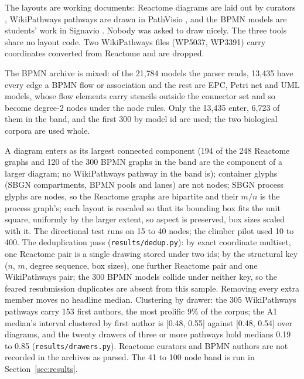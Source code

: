 \documentclass[11pt]{article}
\begin{document}
The layouts are working documents: Reactome diagrams are laid out by curators
\cite{fabregat18}, WikiPathways pathways are drawn in PathVisio \cite{agrawal24}, and the
BPMN models are students' work in Signavio \cite{kunze11, sola23}. Nobody was asked to draw
nicely. The three tools share no layout code. Two
WikiPathways files (WP5037, WP3391) carry coordinates converted from Reactome
\cite{bohler16} and are dropped.

The BPMN archive is mixed: of the 21{,}784 models the parser reads, 13{,}435 have every
edge a BPMN flow or association and the rest are EPC, Petri net and UML models, whose flow
elements carry stencils outside the connector set and so become degree-2 nodes under the
node rules. Only the 13{,}435 enter, 6{,}723 of them in the band, and the first 300 by
model id are used; the two biological corpora are used whole.

A diagram enters as its largest connected component (194 of the 248 Reactome graphs and
120 of the 300 BPMN graphs in the band are the component of a larger diagram; no
WikiPathways pathway in the band is); container glyphs (SBGN compartments, BPMN pools and
lanes) are not nodes; SBGN process glyphs are nodes, so the Reactome graphs are bipartite
and their $m/n$ is the process graph's; each layout is rescaled so that its bounding box
fits the unit square, uniformly by the larger extent, so aspect is preserved, box sizes
scaled with it. The directional test runs on 15 to 40
nodes; the climber pilot used 10 to 400. The deduplication pass
(\texttt{results/dedup.py}): by exact coordinate multiset, one Reactome pair is a single
drawing stored under two ids; by the structural key ($n$, $m$, degree sequence, box
sizes), one further Reactome pair and one WikiPathways pair; the 300 BPMN models collide
under neither key, so the feared resubmission duplicates are absent from this sample.
Removing every extra member moves no headline median. Clustering by drawer: the 305
WikiPathways pathways carry 153 first authors, the most prolific 9\% of the corpus; the
A1 median's interval clustered by first author is [0.48, 0.55] against [0.48, 0.54] over
diagrams, and the twenty drawers of three or more pathways hold medians 0.19 to 0.85
(\texttt{results/drawers.py}). Reactome curators and BPMN authors are not recorded in
the archives as parsed. The 41 to 100 node band is run in Section~\ref{sec:results}.
\end{document}
